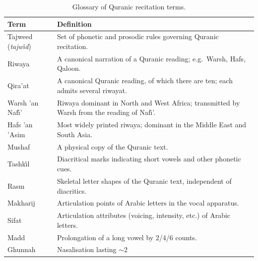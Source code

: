 \begin{table}[H]
  \centering
  \caption{Glossary of Quranic recitation terms.}
  \label{tab:mt_glossary_quran}
  \renewcommand{\arraystretch}{1.3}
  \begin{tabular}{lp{9cm}}
    \toprule
    \textbf{Term} & \textbf{Definition} \\
    \midrule
    Tajweed (\textit{tajw{\^\i}d}) & Set of phonetic and prosodic rules
                                     governing Quranic recitation. \\
    Riwaya                          & A canonical narration of a Quranic
                                     reading; e.g.\ Warsh, Hafs, Qaloon. \\
    Qira'at                         & A canonical Quranic reading, of
                                     which there are ten; each admits
                                     several riwayat. \\
    Warsh 'an Naf{\^\i}'            & Riwaya dominant in North and West
                                     Africa; transmitted by Warsh from
                                     the reading of Naf{\^\i}'. \\
    Hafs 'an 'Asim                  & Most widely printed riwaya;
                                     dominant in the Middle East and
                                     South Asia. \\
    Mushaf                          & A physical copy of the Quranic
                                     text. \\
    Tashk{\^\i}l                    & Diacritical marks indicating short
                                     vowels and other phonetic cues. \\
    Rasm                            & Skeletal letter shapes of the
                                     Quranic text, independent of
                                     diacritics. \\
    Makharij                        & Articulation points of Arabic
                                     letters in the vocal apparatus. \\
    Sifat                           & Articulation attributes (voicing,
                                     intensity, etc.) of Arabic letters. \\
    Madd                            & Prolongation of a long vowel by
                                     2/4/6 counts. \\
    Ghunnah                         & Nasalisation lasting $\sim$2

\end{tabular}
\end{table}
